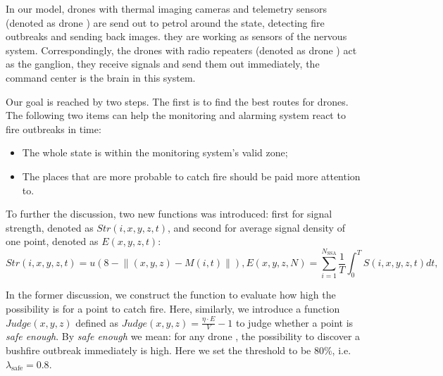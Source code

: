 \documentclass[13pt]{ctexart} %
\begin{document}
In our model, drones with thermal imaging cameras and telemetry sensors (denoted as drone \uppercase\expandafter{}) are send out to petrol around the state, detecting fire outbreaks and sending back images. they are working as sensors of the nervous system. Correspondingly, the drones with radio repeaters (denoted as drone \uppercase\expandafter{}) act as the ganglion, they receive signals and send them out immediately, the command center is the brain in this system.

Our goal is reached by two steps. The first is to find the best routes for drones\uppercase\expandafter{}. The following two items can help the monitoring and alarming system react to fire outbreaks in time:
\begin{itemize}
    \item The whole state is within the monitoring system's valid zone;
    \item The places that are more probable to catch fire should be paid more attention to.
\end{itemize}

To further the discussion, two new functions was introduced: first for signal strength, denoted as $Str(i,x,y,z,t)$, and second for average signal density of one point, denoted as $E(x,y,z,t)$:
\begin{subequations}
    \begin{equation}
        Str(i,x,y,z,t)=u\left(8-\lVert (x,y,z)-M(i,t)\rVert\right),
    \end{equation}
    \begin{equation}
        E(x,y,z,N)=\sum_{i=1}^{N_{\text{SSA}}}\frac{1}{T}\int_{0}^{T}S(i,x,y,z,t)dt,
    \end{equation}
\end{subequations}

In the former discussion, we construct the function \label{PossibilityFire} to evaluate how high the possibility is for a point to catch fire. Here, similarly, we introduce a function $Judge(x, y,z)$ defined as $Judge(x,y,z)=\frac{\eta \cdot E}{V}-1$ to judge whether a point is \textit{safe enough}. By \textit{safe enough} we mean: for any drone \uppercase\expandafter{}, the possibility to discover a bushfire outbreak immediately is high. Here we set the threshold to be 80\%, i.e. $\lambda_{\text{safe}}=0.8$.
\end{document}
